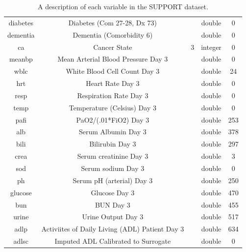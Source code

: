 \documentclass[
]{jss}
\begin{document}
\begin{table}[ht]
\begin{tabular}{ccccc}
diabetes      & Diabetes (Com 27-28, Dx 73)              &                 & double           & 0            \\
dementia      & Dementia (Comorbidity 6)                 &                 & double           & 0            \\
ca              & Cancer State                             & 3               & integer          & 0            \\
meanbp        & Mean Arterial Blood Pressure Day 3       &                 & double           & 0            \\
wblc          & White Blood Cell Count Day 3             &                 & double           & 24           \\
hrt           & Heart Rate Day 3                         &                 & double           & 0            \\
resp          & Respiration Rate Day 3                   &                 & double           & 0            \\
temp          & Temperature (Celsius) Day 3              &                 & double           & 0            \\
pafi          & PaO2/(.01*FiO2) Day 3                    &                 & double           & 253          \\
alb           & Serum Albumin Day 3                      &                 & double           & 378          \\
bili          & Bilirubin Day 3                          &                 & double           & 297          \\
crea          & Serum creatinine Day 3                   &                 & double           & 3            \\
sod           & Serum sodium Day 3                       &                 & double           & 0            \\
ph            & Serum pH (arterial) Day 3                &                 & double           & 250          \\
glucose       & Glucose Day 3                            &                 & double           & 470          \\
bun           & BUN Day 3                                &                 & double           & 455          \\
urine         & Urine Output Day 3                       &                 & double           & 517          \\
adlp          & Activiites of Daily Living (ADL) Patient Day 3 &           & double           & 634          \\
adlsc         & Imputed ADL Calibrated to Surrogate      &                 & double           & 0           
\end{tabular}
\caption{A description of each variable in the SUPPORT dataset.}
\label{tab:support1}
\end{table}
\end{document}
